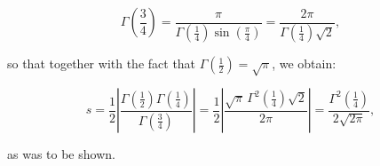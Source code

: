 \begin{solution}
    $$
    \Gamma\left(\frac{3}{4} \right) = \frac{\pi}{\Gamma\left(\frac{1}{4}\right) \sin{\left(\frac{\pi}{4} \right)}}
                                    = \frac{2 \pi}{\Gamma\left(\frac{1}{4}\right) \sqrt{2}},
    $$

    so that together with the fact that $\Gamma\left(\frac{1}{2}\right) = \sqrt{\pi}$, we obtain:

    $$
    s = \frac{1}{2} \left| \frac{\Gamma\left(\frac{1}{2}\right)\Gamma\left(\frac{1}{4}\right)}{\Gamma\left(\frac{3}{4}\right)} \right|
      = \frac{1}{2} \left| \frac{\sqrt{\pi} \, \Gamma^2\left(\frac{1}{4}\right) \sqrt{2}}{2 \pi} \right|
      = \frac{\Gamma^2\left(\frac{1}{4}\right)}{2 \sqrt{2 \pi}},
    $$

    as was to be shown.
\end{solution}
